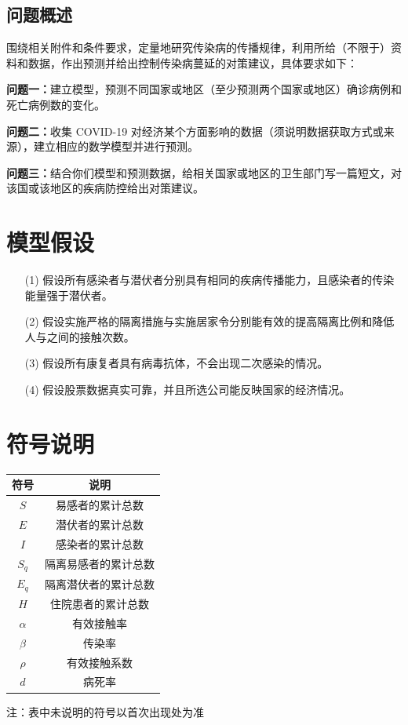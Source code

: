\documentclass{whutmod}
\begin{document}
		\subsection{问题概述}
		    围绕相关附件和条件要求，定量地研究传染病的传播规律，利用所给（不限于）资料和数据，作出预测并给出控制传染病蔓延的对策建议，具体要求如下：
				 
			
			\textbf{问题一：}建立模型，预测不同国家或地区（至少预测两个国家或地区）确诊病例和死亡病例数的变化。
			
			\textbf{问题二：}收集 COVID-19 对经济某个方面影响的数据（须说明数据获取方式或来源），建立相应的数学模型并进行预测。
			
			\textbf{问题三：}结合你们模型和预测数据，给相关国家或地区的卫生部门写一篇短文，对该国或该地区的疾病防控给出对策建议。

	
	\section{模型假设}
\begin{itemize}                                             
	\item [(1)] 假设所有感染者与潜伏者分别具有相同的疾病传播能力，且感染者的传染能量强于潜伏者。
	\item [(2)]假设实施严格的隔离措施与实施居家令分别能有效的提高隔离比例和降低人与之间的接触次数。
	\item [(3)] 假设所有康复者具有病毒抗体，不会出现二次感染的情况。
	\item [(4)] 假设股票数据真实可靠，并且所选公司能反映国家的经济情况。
\end{itemize}


	\section{符号说明}
\begin{table}[H]
	\centering
	\setlength{\tabcolsep}{12mm}
	\begin{tabular}{cc}
		\toprule[1.5pt]
		\multicolumn{1}{m{5cm}}{\centering 符号} & \multicolumn{1}{m{5cm}}{\centering 说明} \\
		\midrule[1pt]		
		$S$& 易感者的累计总数\\
		$E$&潜伏者的累计总数\\
		$I$&感染者的累计总数\\
		$S_q$&隔离易感者的累计总数\\
		$E_q$&隔离潜伏者的累计总数\\
		$H$&住院患者的累计总数\\
		$\alpha$&有效接触率\\
		$\beta$&传染率\\
		$\rho$&有效接触系数\\
		$d$&病死率\\
		\bottomrule[1.5pt]
	\end{tabular}
	\begin{tablenotes}
		\item 注：表中未说明的符号以首次出现处为准
	\end{tablenotes}
\end{table}
\end{document}
